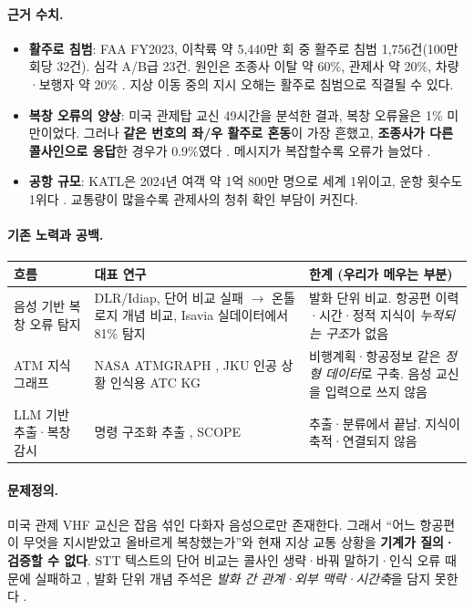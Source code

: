 \documentclass[10pt,a4paper]{article}
\begin{document}
\paragraph{근거 수치.}
\begin{itemize}
\item \textbf{활주로 침범}: FAA FY2023, 이착륙 약 5,440만 회 중 활주로 침범 1,756건(100만 회당 32건). 심각 A/B급 23건. 원인은 조종사 이탈 약 60\%, 관제사 약 20\%, 차량·보행자 약 20\% \cite{faaincursion}. 지상 이동 중의 지시 오해는 활주로 침범으로 직결될 수 있다.
\item \textbf{복창 오류의 양상}: 미국 관제탑 교신 49시간을 분석한 결과, 복창 오류율은 1\% 미만이었다. 그러나 \textbf{같은 번호의 좌/우 활주로 혼동}이 가장 흔했고, \textbf{조종사가 다른 콜사인으로 응답}한 경우가 0.9\%였다 \cite{cardosi94}. 메시지가 복잡할수록 오류가 늘었다 \cite{cardosi93,prinzo2006}.
\item \textbf{공항 규모}: KATL은 2024년 여객 약 1억 800만 명으로 세계 1위이고, 운항 횟수도 1위다 \cite{aci2024}. 교통량이 많을수록 관제사의 청취 확인 부담이 커진다.
\end{itemize}

\paragraph{기존 노력과 공백.}
\begin{center}\small
\begin{tabularx}{\textwidth}{@{}>{\raggedright\arraybackslash}p{3.8cm}>{\raggedright\arraybackslash}X>{\raggedright\arraybackslash}X@{}}
\toprule
흐름 & 대표 연구 & 한계 (우리가 메우는 부분)\\\midrule
음성 기반 복창 오류 탐지 & DLR/Idiap, 단어 비교 실패 $\to$ 온톨로지 개념 비교, Isavia 실데이터에서 81\% 탐지 \cite{helmke2021,helmke2022} & 발화 단위 비교. 항공편 이력·시간·정적 지식이 \emph{누적되는 구조}가 없음\\
ATM 지식 그래프 & NASA ATMGRAPH \cite{keller2019}, JKU 인공 상황 인식용 ATC KG \cite{schrefl2022} & 비행계획·항공정보 같은 \emph{정형 데이터}로 구축. 음성 교신을 입력으로 쓰지 않음\\
LLM 기반 추출·복창 감시 & 명령 구조화 추출 \cite{mekerishvili2025}, SCOPE \cite{scope2026} & 추출·분류에서 끝남. 지식이 축적·연결되지 않음\\
\bottomrule
\end{tabularx}
\end{center}

\paragraph{문제정의.} 미국 관제 VHF 교신은 잡음 섞인 다화자 음성으로만 존재한다. 그래서 ``어느 항공편이 무엇을 지시받았고 올바르게 복창했는가''와 현재 지상 교통 상황을 \textbf{기계가 질의·검증할 수 없다}. STT 텍스트의 단어 비교는 콜사인 생략·바꿔 말하기·인식 오류 때문에 실패하고 \cite{helmke2021}, 발화 단위 개념 주석은 \emph{발화 간 관계·외부 맥락·시간축}을 담지 못한다 \cite{kleinert2021}.
\end{document}
